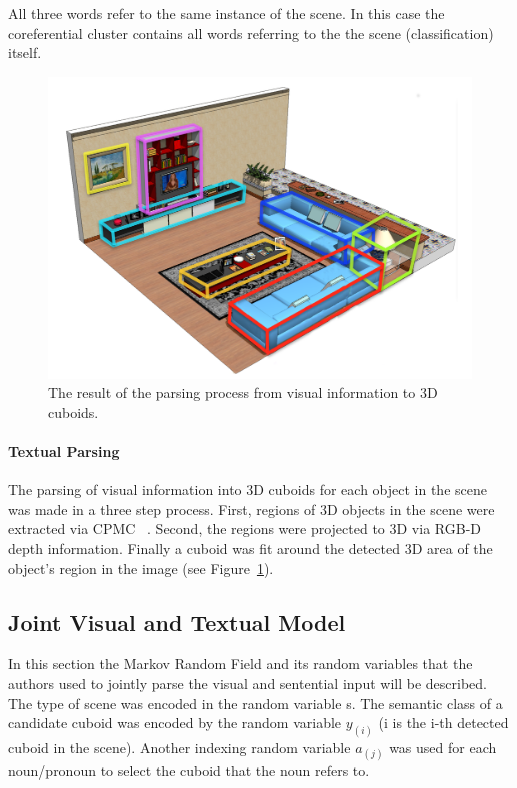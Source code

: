 \documentclass{utue} %
\begin{document}
All three words refer to the same instance of the scene. In this case the coreferential cluster contains all words referring to the the scene (classification) itself.

\begin{figure}[h!]
  \centering
  \includegraphics[width=.9\columnwidth]{images/scene_only_centered.png}
  \caption{\label{fig:3Dcuboids} The result of the parsing process from visual information to 3D cuboids.}
\end{figure}

\paragraph{Textual Parsing}
The parsing of visual information into 3D cuboids for each object in the scene was made in a three step process. First, regions of 3D objects in the scene were extracted via CPMC ~\cite{carreira2012}. Second, the regions were projected to 3D via RGB-D depth information. Finally a cuboid was fit around the detected 3D area of the object's region in the image (see Figure~\ref{fig:3Dcuboids}).

\subsection{Joint Visual and Textual Model} \label{Joint Visual and Textual Model}

In this section the Markov Random Field and its random variables that the authors used to jointly parse the visual and sentential input will be described. The type of scene was encoded in the random variable s. The semantic class of a candidate cuboid was encoded by the random variable $y_{(i)}$ (i is the i-th detected cuboid in the scene). Another indexing random variable $a_{(j)}$ was used for each noun/pronoun to select the cuboid that the noun refers to.
\end{document}

